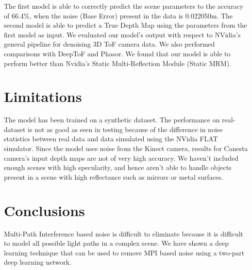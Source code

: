 \documentclass[runningheads]{llncs}
\begin{document}
The first model is able to correctly predict the scene parameters to the accuracy of 66.4\%, when the noise (Base Error) present in the data is 0.022050m. 
The second model is able to predict a True Depth Map using the parameters from the first model as input.
\newline
\newline
We evaluated our model's output with respect to NVidia's general pipeline for denoising 3D ToF camera data. 
We also performed comparisons with DeepToF and Phasor. 
We found that our model is able to perform better than Nvidia's Static Multi-Reflection Module (Static MRM). 


\section{Limitations}

The model has been trained on a synthetic dataset. 
The performance on real-dataset is not as good as seen in testing because of the difference in noise statistics between real data and data simulated using the NVidia FLAT simulator. 
Since the model uses noise from the Kinect camera, results for Canesta camera's input depth maps are not of very high accuracy. 
\newline
\newline
We haven't included enough scenes with high specularity, and hence aren't able to handle objects present in a scene with high reflectance such as mirrors or metal surfaces. 


\section{Conclusions}


Multi-Path Interference based noise is difficult to eliminate because it is difficult to model all possible light paths in a complex scene. 
We have shown a deep learning technique that can be used to remove MPI based noise using a two-part deep learning network. 


\end{document}
